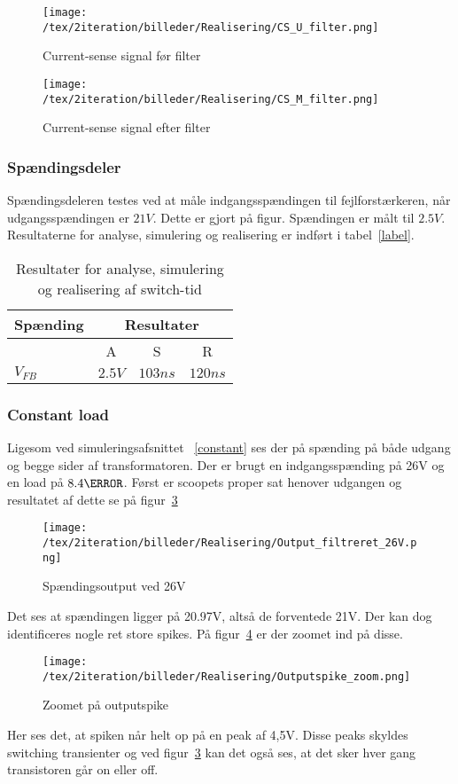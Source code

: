 \begin{figure}[H]
	\center
	\texttt{[image: /tex/2iteration/billeder/Realisering/CS\_U\_filter.png]}
	\caption{Current-sense signal før filter}
	\label{fig:CS_U_filter}
\end{figure}

\begin{figure}[H]
	\center
	\texttt{[image: /tex/2iteration/billeder/Realisering/CS\_M\_filter.png]}
	\caption{Current-sense signal efter filter}
	\label{fig:CS_M_filter}
\end{figure}


\subsubsection{Spændingsdeler}
Spændingsdeleren testes ved at måle indgangsspændingen til fejlforstærkeren, når udgangsspændingen er $21V$. Dette er gjort på figur. Spændingen er målt til $2.5V$. Resultaterne for analyse, simulering og realisering er indført i tabel~\ref{label}.

\begin{table}[H] 			
	\centering
	\begin{tabularx}{\textwidth}{|X|c|c|c|}
		\hline
		\textbf{Spænding} & \multicolumn{3}{|c|}{\textbf{Resultater}} 		\\ \hline
		& A & S & R 									\\ \hline
		$V_{FB}$ & $2.5V$ & $103ns$ & $120ns$ 									\\ \hline 
		
	\end{tabularx}
	\caption{Resultater for analyse, simulering og realisering af switch-tid}
	\label{tab:resultat_voltage_divider}
\end{table}

\subsubsection{Constant load}
Ligesom ved simuleringsafsnittet ~\ref{constant} ses der på spænding på både udgang og begge sider af transformatoren. Der er brugt en indgangsspænding på 26V og en load på $8.4\ohm$. 
Først er scoopets proper sat henover udgangen og resultatet af dette se på figur~\ref{fig: Out26V}
\begin{figure}[H]
	\center
	\texttt{[image: /tex/2iteration/billeder/Realisering/Output\_filtreret\_26V.png]}
	\caption{Spændingsoutput ved 26V}
	\label{fig: Out26V}
\end{figure}
Det ses at spændingen ligger på 20.97V, altså de forventede 21V. Der kan dog identificeres nogle ret store spikes. På figur~\ref{fig: Out26Vzoom} er der zoomet ind på disse.
\begin{figure}[H]
	\center
	\texttt{[image: /tex/2iteration/billeder/Realisering/Outputspike\_zoom.png]}
	\caption{Zoomet på outputspike}
	\label{fig: Out26Vzoom}
\end{figure}
Her ses det, at spiken når helt op på en peak af 4,5V. Disse peaks skyldes switching transienter og ved figur~\ref{fig: Out26V} kan det også ses, at det sker hver gang transistoren går on eller off.

